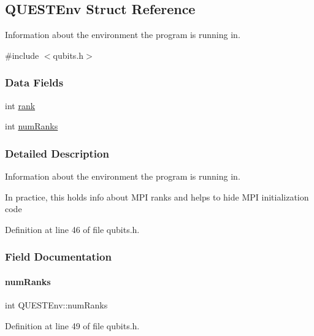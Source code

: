 \hypertarget{structQUESTEnv}{}\subsection{Q\+U\+E\+S\+T\+Env Struct Reference}
\label{structQUESTEnv}


Information about the environment the program is running in.  




{\ttfamily \#include $<$qubits.\+h$>$}

\subsubsection*{Data Fields}
\begin{DoxyCompactItemize}
\item 
int \hyperlink{structQUESTEnv_a1bdb6d425a2ce6a468f93929c0b26d73}{rank}
\item 
int \hyperlink{structQUESTEnv_ab9d9ce82e2d5f1b39aa9efc3accb3742}{num\+Ranks}
\end{DoxyCompactItemize}


\subsubsection{Detailed Description}
Information about the environment the program is running in. 

In practice, this holds info about M\+PI ranks and helps to hide M\+PI initialization code 

Definition at line 46 of file qubits.\+h.



\subsubsection{Field Documentation}
\mbox{\label{structQUESTEnv_ab9d9ce82e2d5f1b39aa9efc3accb3742}} 
\paragraph{\texorpdfstring{num\+Ranks}{numRanks}}
{\footnotesize\ttfamily int Q\+U\+E\+S\+T\+Env\+::num\+Ranks}



Definition at line 49 of file qubits.\+h.




